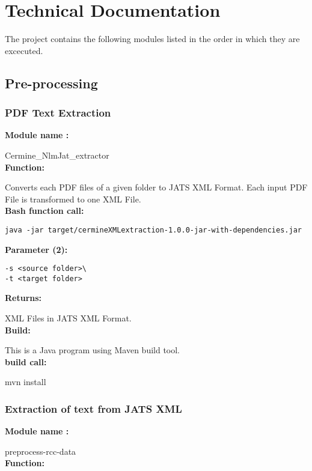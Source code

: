 \section{Technical Documentation}
\label{sec:techdoc}
The project contains the following modules listed in the order in which they are excecuted.

\subsection{Pre-processing}
\subsubsection{PDF Text Extraction}
\textbf{Module name : }

Cermine_NlmJat_extractor\\
\textbf{Function: }

Converts each PDF files of a given folder to JATS XML Format. Each input PDF File is transformed to one XML File.\\
\textbf{Bash function call: }
\begin{lstlisting}
java -jar target/cermineXMLextraction-1.0.0-jar-with-dependencies.jar
\end{lstlisting}
\textbf{Parameter (2): }
\begin{lstlisting}
-s <source folder>\
-t <target folder>
\end{lstlisting}
\textbf{Returns: }

XML Files in JATS XML Format.\\
\textbf{Build: }

This is a Java program using Maven build tool.\\
\textbf{build call: }

mvn install

\subsubsection{Extraction of text from JATS XML}
\textbf{Module name : }

preprocess-rcc-data\\
\textbf{Function: }

